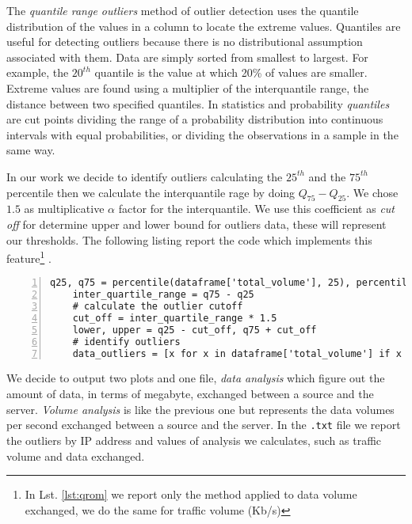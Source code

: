 The \textit{quantile range outliers} method of outlier detection uses the quantile distribution of the values in a column to locate the extreme values. Quantiles are useful for detecting outliers because there is no distributional assumption associated with them. Data are simply sorted from smallest to largest. For example, the $20^{th}$ quantile is the value at which 20\% of values are smaller. Extreme values are found using a multiplier of the interquantile range, the distance between two specified quantiles.
In statistics and probability \textit{quantiles} are cut points dividing the range of a probability distribution into continuous intervals with equal probabilities, or dividing the observations in a sample in the same way. 

In our work we decide to identify outliers calculating the $25^{th}$ and the $75^{th}$ percentile then we calculate the interquantile rage by doing $Q_{75}-Q_{25}$. We chose $1.5$ as multiplicative $\alpha$ factor for the interquantile. 
We use this coefficient as \textit{cut off} for determine upper and lower bound for outliers data, these will represent our thresholds. 
The following listing report the code which implements this feature\footnote{In Lst. \ref{lst:qrom} we report only the method applied to data volume exchanged, we do the same for traffic volume (Kb/s)} .
 
 \begin{lstlisting}[numbers=left, columns=flexible, breaklines=true, frame=tb, caption={quantile range outliers method}, label={lst:qrom}]
    q25, q75 = percentile(dataframe['total_volume'], 25), percentile(dataframe['total_volume'], 75)
    inter_quartile_range = q75 - q25
    # calculate the outlier cutoff
    cut_off = inter_quartile_range * 1.5
    lower, upper = q25 - cut_off, q75 + cut_off
    # identify outliers
    data_outliers = [x for x in dataframe['total_volume'] if x < lower or x > upper]
\end{lstlisting}

We decide to output two plots and one file, \textit{data analysis} which figure out the amount of data, in terms of megabyte, exchanged between a source and the server. \textit{Volume analysis} is like the previous one but represents the data volumes per second exchanged between a source and the server. In the \texttt{.txt} file we report the outliers by IP address and values of analysis we calculates, such as traffic volume and data exchanged.
\bigskip
